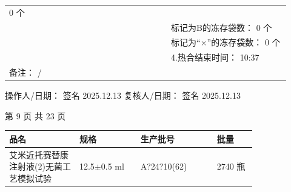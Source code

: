 \documentclass[UTF8,10pt,a4paper,fontset=fandol]{ctexart}
\newcommand{\fieldvalue}[1]{#1}
\newcommand{\handwritten}[1]{#1}
\begin{document}
\begin{tabular}{|p{0.53\linewidth}|p{0.39\linewidth}|}
\fieldvalue{\handwritten{0}} 个\\
&\quad 标记为B的冻存袋数：
\fieldvalue{\handwritten{0}} 个\\
&\quad 标记为“×”的冻存袋数：
\fieldvalue{\handwritten{0}} 个\\
&4.热合结束时间：
\fieldvalue{\handwritten{10:37}}\\
\hline
\multicolumn{2}{|l|}{备注：
\fieldvalue{\handwritten{/}}}\\
\hline
\end{tabular}

\noindent 操作人/日期：
\fieldvalue{\handwritten{签名}} \quad
\fieldvalue{\handwritten{2025.12.13}}
\hfill
复核人/日期：
\fieldvalue{\handwritten{签名}} \quad
\fieldvalue{\handwritten{2025.12.13}}

\begin{center}
第 9 页 共 23 页
\end{center}

\newpage

\begin{center}
\small
\begin{tabular}{|p{0.23\linewidth}|p{0.20\linewidth}|p{0.25\linewidth}|p{0.13\linewidth}|}
\hline
品名 & 规格 & 生产批号 & 批量\\
\hline
艾米近托赛替康注射液(2)无菌工艺模拟试验
&
12.5$\pm$0.5 ml
&
\fieldvalue{\handwritten{A?24?10(62)}}
&
\fieldvalue{\handwritten{2740}} 瓶
\\
\hline
\end{tabular}
\end{center}
\end{document}
